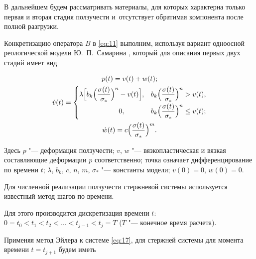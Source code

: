 В дальнейшем будем рассматривать материалы, для которых характерна только первая и вторая стадия ползучести и~отсутствует обратимая компонента после полной разгрузки.

Конкретизацию оператора $B$ в \eqref{eq:11} выполним, используя вариант одноосной реологической модели Ю.~П.~Самарина \cite{27-Samarin1979}, который для описания первых двух стадий имеет вид


\begin{gather}

p(t)= v (t) + w(t); \\

\label{eq:17}

\dot { v } ( t ) = 

\begin{cases}

\lambda \Bigl[ b_k \Bigl( \dfrac{\sigma ( t )}{\sigma_\ast} \Bigr)^{n}- v  ( t )

\Bigr], & b_k \Bigl( \dfrac{\sigma ( t )}{\sigma_\ast} \Bigr)^{n} >  v  ( t ), \\[2mm]

\hspace{2cm}0, & b_k \Bigl( \dfrac{\sigma ( t )}{\sigma_\ast} \Bigr)^{n} \le  v  ( t ); 

\end{cases} \\

\dot {w} ( t ) = c \Bigl( \frac{\sigma ( t )}{\sigma_\ast} \Bigr)^{m}.

\end{gather}


Здесь $p$ "--- деформация ползучести; $ v $, $w$ "--- вязкопластическая и вязкая составляющие деформации $p$ соответственно; точка означает дифференцирование по времени $t$; $\lambda$, $b_k$, $c$, $n$, $m$, $\sigma_\ast$ "--- константы модели; $v(0) = 0$, $w(0) = 0$.



Для численной реализации ползучести стержневой системы используется известный метод шагов по времени.

Для этого производится дискретизация времени $t$: $0 = t_0 < t_1 < t_2 < \ldots < t_{j-1} < t_j = T$ ($T$ "--- конечное время расчета).

Применяя метод Эйлера к системе \eqref{eq:17}, для стержней системы для момента времени $t = t_{j+1}$ будем иметь

